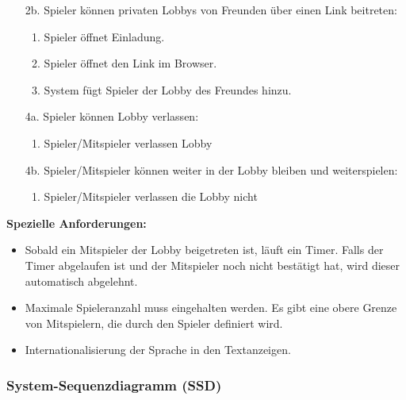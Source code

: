 \documentclass[11pt,ngerman]{article}
\begin{document}
\begin{tcolorbox}
\begin{itemize}
                    \item[2b.] Spieler können privaten Lobbys von Freunden über einen Link beitreten:
                        \begin{enumerate}
                            \item Spieler öffnet Einladung.
                            \item Spieler öffnet den Link im Browser.
                            \item System fügt Spieler der Lobby des Freundes hinzu.
                        \end{enumerate}
                    \item[4a.] Spieler können Lobby verlassen:
                        \begin{enumerate}
                            \item Spieler/Mitspieler verlassen Lobby
                        \end{enumerate}
                    \item[4b.] Spieler/Mitspieler können weiter in der Lobby bleiben und weiterspielen:
                        \begin{enumerate}
                            \item Spieler/Mitspieler verlassen die Lobby nicht
                        \end{enumerate}
                \end{itemize}
                \textbf{Spezielle Anforderungen:}
                 \begin{itemize}
                    \item Sobald ein Mitspieler der Lobby beigetreten ist, läuft ein Timer. Falls der Timer abgelaufen ist und der Mitspieler noch nicht bestätigt hat, wird dieser automatisch abgelehnt.
                    \item Maximale Spieleranzahl muss eingehalten werden. Es gibt eine obere Grenze von Mitspielern, die durch den Spieler definiert wird.
                    \item Internationalisierung der Sprache in den Textanzeigen.
                \end{itemize}

            \end{tcolorbox}

         \subsubsection{System-Sequenzdiagramm (SSD)}
\end{document}
